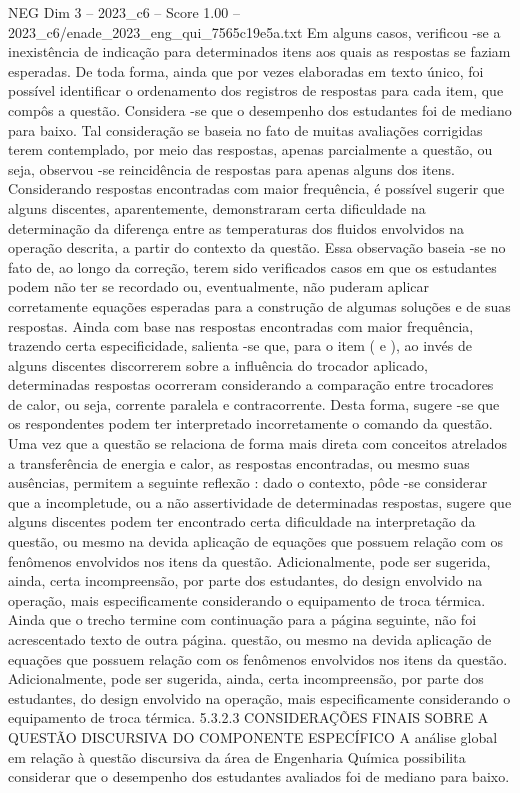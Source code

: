 \begin{textsample}{NEG Dim 3 – 2023\_c6 – Score 1.00 – 2023\_c6/enade\_2023\_eng\_qui\_7565c19e5a.txt}
Em alguns casos, verificou -se a inexistência de indicação para determinados itens aos quais as respostas se faziam esperadas.
De toda forma, ainda que por vezes elaboradas em texto único, foi possível identificar o ordenamento dos registros de respostas para cada item, que compôs a questão.
Considera -se que o desempenho dos estudantes foi de mediano para baixo.
Tal consideração se baseia no fato de muitas avaliações corrigidas terem contemplado, por meio das respostas, apenas parcialmente a questão, ou seja, observou -se reincidência de respostas para apenas alguns dos itens.
Considerando respostas encontradas com maior frequência, é possível sugerir que alguns discentes, aparentemente, demonstraram certa dificuldade na determinação da diferença entre as temperaturas dos fluidos envolvidos na operação descrita, a partir do contexto da questão.
Essa observação baseia -se no fato de, ao longo da correção, terem sido verificados casos em que os estudantes podem não ter se recordado ou, eventualmente, não puderam aplicar corretamente equações esperadas para a construção de algumas soluções e de suas respostas.
Ainda com base nas respostas encontradas com maior frequência, trazendo certa especificidade, salienta -se que, para o item ( e ), ao invés de alguns discentes discorrerem sobre a influência do trocador aplicado, determinadas respostas ocorreram considerando a comparação entre trocadores de calor, ou seja, corrente paralela e contracorrente.
Desta forma, sugere -se que os respondentes podem ter interpretado incorretamente o comando da questão.
Uma vez que a questão se relaciona de forma mais direta com conceitos atrelados a transferência de energia e calor, as respostas encontradas, ou mesmo suas ausências, permitem a seguinte reflexão : dado o contexto, pôde -se considerar que a incompletude, ou a não assertividade de determinadas respostas, sugere que alguns discentes podem ter encontrado certa dificuldade na interpretação da questão, ou mesmo na devida aplicação de equações que possuem relação com os fenômenos envolvidos nos itens da questão.
Adicionalmente, pode ser sugerida, ainda, certa incompreensão, por parte dos estudantes, do design envolvido na operação, mais especificamente considerando o equipamento de troca térmica.
Ainda que o trecho termine com continuação para a página seguinte, não foi acrescentado texto de outra página. questão, ou mesmo na devida aplicação de equações que possuem relação com os fenômenos envolvidos nos itens da questão.
Adicionalmente, pode ser sugerida, ainda, certa incompreensão, por parte dos estudantes, do design envolvido na operação, mais especificamente considerando o equipamento de troca térmica. 5.3.2.3 CONSIDERAÇÕES FINAIS SOBRE A QUESTÃO DISCURSIVA DO COMPONENTE ESPECÍFICO A análise global em relação à questão discursiva da área de Engenharia Química possibilita considerar que o desempenho dos estudantes avaliados foi de mediano para baixo.

\end{textsample}
